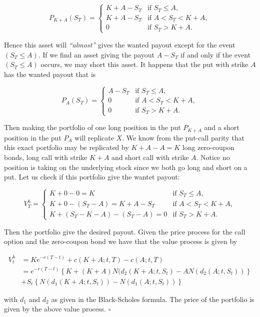 \documentclass[
]{article}
\begin{document}
\[
P_{K+A}(S_T)=
\begin{cases}
  K+A-S_T & \text{if }S_T\le A,\\
  K+A-S_T & \text{if }A<S_T<K+ A,\\
  0 & \text{if }S_T > K+ A.
\end{cases}
\]

Hence this asset will \emph{``almost''} gives the wanted payout except
for the event \((S_T\le A)\). If we find an asset giving the payout
\(A-S_T\) if and only if the event \((S_T\le A)\) occurs, we may short
this asset. It happens that the put with strike \(A\) has the wanted
payout that is

\[
P_{A}(S_T)=
\begin{cases}
  A-S_T & \text{if }S_T\le A,\\
  0 & \text{if }A<S_T<K+ A,\\
  0 & \text{if }S_T > K+ A.
\end{cases}
\]

Then making the portfolio of one long position in the put \(P_{K+A}\)
and a short position in the put \(P_A\) will replicate \(X\). We know
from the put-call parity that this exact portfolio may be replicated by
\(K+A-A=K\) long zero-coupon bonds, long call with strike \(K+A\) and
short call with strike \(A\). Notice no position is taking on the
underlying stock since we both go long and short on a put. Let us check
if this portfolio give the wantet payout:

\[
V^h_T=
\begin{cases}
  K +0-0 = K & \text{if }S_T\le A,\\
  K + 0 - (S_T-A)=K+A-S_T & \text{if }A<S_T<K+ A,\\
  K + (S_T-K-A)-(S_T-A)=0 & \text{if }S_T > K+ A.
\end{cases}
\]

Then the portfolio give the desired payout. Given the price process for
the call option and the zero-coupon bond we have that the value process
is given by

\begin{align*}
V_t^h&=Ke^{-r(T-t)}+c(K+A;t,T)-c(A;t,T)\\
&=e^{-r(T-t)}\left\{K+(K+A)N(d_2(K+A;t,S_t)-AN(d_2(A;t,S_t))\right\}\\
&+S_t\left\{N(d_1(K+A;t,S_t))-N(d_1(A;t,S_t))\right\}
\end{align*}

with \(d_1\) and \(d_2\) as given in the Black-Scholes formula. The
price of the portfolio is given by the above value process. \(\square\)
\end{document}

